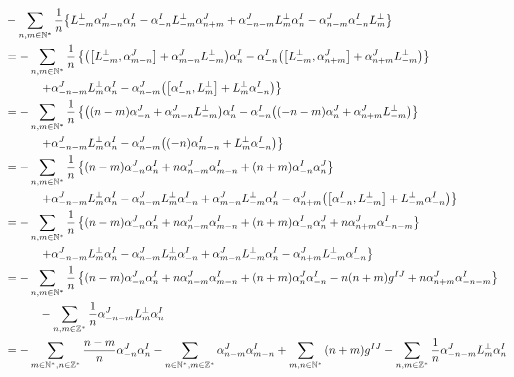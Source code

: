 \begin{align*}
    &-\sum\limits_{n,m\in\mathbb N^\ast}\frac{1}{n}\qty{L^\perp_{-m}\alpha^J_{m-n}\alpha^I_{n}-\alpha^I_{-n}L^\perp_{-m}\alpha^J_{n+m}+\alpha^J_{-n-m}L^\perp_m\alpha^I_{n}-\alpha^J_{n-m}\alpha^I_{-n}L^\perp_m}\\
    &=-\sum\limits_{n,m\in\mathbb N^\ast}\frac{1}{n}\left\{\qty(\comm{L^\perp_{-m}}{\alpha^J_{m-n}}+\alpha^J_{m-n}L^\perp_{-m})\alpha^I_{n}-\alpha^I_{-n}\qty(\comm{L^\perp_{-m}}{\alpha^J_{n+m}}+\alpha^J_{n+m}L^\perp_{-m})\right\}\\
    &\quad\quad\quad\left.+\alpha^J_{-n-m}L^\perp_m\alpha^I_{n}-\alpha^J_{n-m}\qty(\comm{\alpha^I_{-n}}{L^\perp_m}+L^\perp_m\alpha^I_{-n})\right\}\\
    &=-\sum\limits_{n,m\in\mathbb N^\ast}\frac{1}{n}\left\{\qty(\qty(n-m)\alpha^J_{-n}+\alpha^J_{m-n}L^\perp_{-m})\alpha^I_{n}-\alpha^I_{-n}\qty(\qty(-n-m)\alpha^J_n+\alpha^J_{n+m}L^\perp_{-m})\right\}\\
    &\quad\quad\quad\left.+\alpha^J_{-n-m}L^\perp_m\alpha^I_{n}-\alpha^J_{n-m}\qty(\qty(-n)\alpha^I_{m-n}+L^\perp_m\alpha^I_{-n})\right\}\\
    &=-\sum\limits_{n,m\in\mathbb N^\ast}\frac{1}{n}\left\{\qty(n-m)\alpha^J_{-n}\alpha^I_{n}+n\alpha^J_{n-m}\alpha^I_{m-n}+\qty(n+m)\alpha^I_{-n}\alpha^J_n\right\}\\
    &\quad\quad\quad\left.+\alpha^J_{-n-m}L^\perp_m\alpha^I_{n}-\alpha^J_{n-m}L^\perp_m\alpha^I_{-n}+\alpha^J_{m-n}L^\perp_{-m}\alpha^I_{n}-\alpha^J_{n+m}\qty(\comm{\alpha^I_{-n}}{L^\perp_{-m}}+L^\perp_{-m}\alpha^I_{-n})\right\}\\
    &=-\sum\limits_{n,m\in\mathbb N^\ast}\frac{1}{n}\left\{\qty(n-m)\alpha^J_{-n}\alpha^I_{n}+n\alpha^J_{n-m}\alpha^I_{m-n}+\qty(n+m)\alpha^I_{-n}\alpha^J_n+n\alpha^J_{n+m}\alpha^I_{-n-m}\right\}\\
    &\quad\quad\quad\left.+\alpha^J_{-n-m}L^\perp_m\alpha^I_{n}-\alpha^J_{n-m}L^\perp_m\alpha^I_{-n}+\alpha^J_{m-n}L^\perp_{-m}\alpha^I_{n}-\alpha^J_{n+m}L^\perp_{-m}\alpha^I_{-n}\right\}\\
    &=-\sum\limits_{n,m\in\mathbb N^\ast}\frac{1}{n}\left\{\qty(n-m)\alpha^J_{-n}\alpha^I_{n}+n\alpha^J_{n-m}\alpha^I_{m-n}+\qty(n+m)\alpha^J_{n}\alpha^I_{-n}-n\qty(n+m)g^{IJ}+n\alpha^J_{n+m}\alpha^I_{-n-m}\right\}\\
    &\quad\quad\quad-\sum\limits_{n,m\in\mathbb Z^\ast}\frac1n\alpha^J_{-n-m}L^\perp_m\alpha^I_{n}\\
    &=-\sum\limits_{m\in\mathbb N^\ast,n\in\mathbb Z^\ast}\frac{n-m}{n}\alpha^J_{-n}\alpha^I_{n}-\sum\limits_{n\in\mathbb N^\ast,m\in\mathbb Z^\ast}\alpha^J_{n-m}\alpha^I_{m-n}+\sum\limits_{m,n\in\mathbb N^\ast}\qty(n+m)g^{IJ}-\sum\limits_{n,m\in\mathbb Z^\ast}\frac1n\alpha^J_{-n-m}L^\perp_m\alpha^I_{n}\\

\end{align*}
